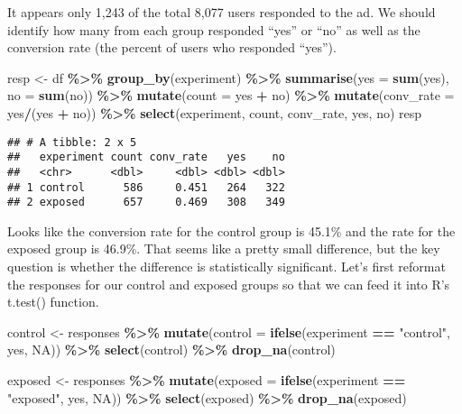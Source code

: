 \documentclass[
]{article}
\newenvironment{Shaded}{\begin{snugshade}}{\end{snugshade}}
\newcommand{\AttributeTok}[1]{\textcolor[rgb]{0.13,0.29,0.53}{#1}}
\newcommand{\ConstantTok}[1]{\textcolor[rgb]{0.56,0.35,0.01}{#1}}
\newcommand{\FunctionTok}[1]{\textcolor[rgb]{0.13,0.29,0.53}{\textbf{#1}}}
\newcommand{\NormalTok}[1]{#1}
\newcommand{\OtherTok}[1]{\textcolor[rgb]{0.56,0.35,0.01}{#1}}
\newcommand{\SpecialCharTok}[1]{\textcolor[rgb]{0.81,0.36,0.00}{\textbf{#1}}}
\newcommand{\StringTok}[1]{\textcolor[rgb]{0.31,0.60,0.02}{#1}}
\begin{document}
It appears only 1,243 of the total 8,077 users responded to the ad. We
should identify how many from each group responded ``yes'' or ``no'' as
well as the conversion rate (the percent of users who responded
``yes'').

\begin{Shaded}
\begin{Highlighting}[]
\NormalTok{resp }\OtherTok{\textless{}{-}}\NormalTok{ df }\SpecialCharTok{\%\textgreater{}\%}
  \FunctionTok{group\_by}\NormalTok{(experiment) }\SpecialCharTok{\%\textgreater{}\%}
  \FunctionTok{summarise}\NormalTok{(}\AttributeTok{yes =} \FunctionTok{sum}\NormalTok{(yes), }\AttributeTok{no =} \FunctionTok{sum}\NormalTok{(no)) }\SpecialCharTok{\%\textgreater{}\%}
  \FunctionTok{mutate}\NormalTok{(}\AttributeTok{count =}\NormalTok{ yes }\SpecialCharTok{+}\NormalTok{ no) }\SpecialCharTok{\%\textgreater{}\%}
  \FunctionTok{mutate}\NormalTok{(}\AttributeTok{conv\_rate =}\NormalTok{ yes}\SpecialCharTok{/}\NormalTok{(yes }\SpecialCharTok{+}\NormalTok{ no)) }\SpecialCharTok{\%\textgreater{}\%}
  \FunctionTok{select}\NormalTok{(experiment, count, conv\_rate, yes, no)}
\NormalTok{resp}
\end{Highlighting}
\end{Shaded}

\begin{verbatim}
## # A tibble: 2 x 5
##   experiment count conv_rate   yes    no
##   <chr>      <dbl>     <dbl> <dbl> <dbl>
## 1 control      586     0.451   264   322
## 2 exposed      657     0.469   308   349
\end{verbatim}

Looks like the conversion rate for the control group is 45.1\% and the
rate for the exposed group is 46.9\%. That seems like a pretty small
difference, but the key question is whether the difference is
statistically significant. Let's first reformat the responses for our
control and exposed groups so that we can feed it into R's t.test()
function.

\begin{Shaded}
\begin{Highlighting}[]
\NormalTok{control }\OtherTok{\textless{}{-}}\NormalTok{ responses }\SpecialCharTok{\%\textgreater{}\%}
  \FunctionTok{mutate}\NormalTok{(}\AttributeTok{control =} \FunctionTok{ifelse}\NormalTok{(experiment }\SpecialCharTok{==} \StringTok{"control"}\NormalTok{, yes, }\ConstantTok{NA}\NormalTok{)) }\SpecialCharTok{\%\textgreater{}\%}
  \FunctionTok{select}\NormalTok{(control) }\SpecialCharTok{\%\textgreater{}\%}
  \FunctionTok{drop\_na}\NormalTok{(control)}

\NormalTok{exposed }\OtherTok{\textless{}{-}}\NormalTok{ responses }\SpecialCharTok{\%\textgreater{}\%}
  \FunctionTok{mutate}\NormalTok{(}\AttributeTok{exposed =} \FunctionTok{ifelse}\NormalTok{(experiment }\SpecialCharTok{==} \StringTok{"exposed"}\NormalTok{, yes, }\ConstantTok{NA}\NormalTok{)) }\SpecialCharTok{\%\textgreater{}\%}
  \FunctionTok{select}\NormalTok{(exposed) }\SpecialCharTok{\%\textgreater{}\%}
  \FunctionTok{drop\_na}\NormalTok{(exposed)}
\end{Highlighting}
\end{Shaded}
\end{document}
